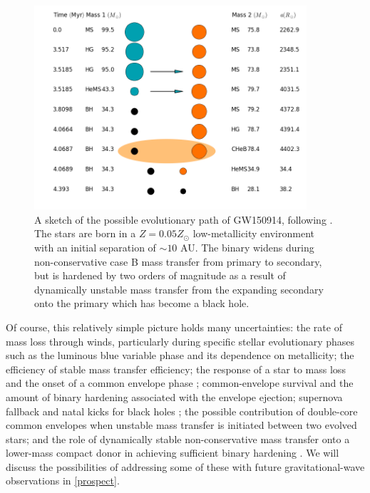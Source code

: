 \documentclass[iop,onecolumn]{revtex4}
\begin{document}
\begin{figure}
	\centering
	\includegraphics[width=0.9\textwidth]{COMPAS.png}
	\caption{\label{fig:COMPAS} A sketch of the possible evolutionary path of GW150914, following \citet{Stevenson:2017}.  The stars are born in a $Z=0.05 Z_\odot$ low-metallicity environment with an initial separation of $\sim 10$ AU.  The binary widens during non-conservative case B mass transfer from primary to secondary, but is hardened by two orders of magnitude as a result of dynamically unstable mass transfer from the expanding secondary onto the primary which has become a black hole.}
\end{figure}

Of course, this relatively simple picture holds many uncertainties: the rate of mass loss through winds, particularly during specific stellar evolutionary phases such as the luminous blue variable phase \citep{Mennekens:2014} and its dependence on metallicity; the efficiency of stable mass transfer efficiency; the response of a star to mass loss and the onset of a common envelope phase \citep{Pavlovskii:2017}; common-envelope survival and the amount of binary hardening associated with the envelope ejection; supernova fallback and natal kicks for black holes \citep[e.g.,][]{Repetto:2012,Mandel:2015kicks}; the possible contribution of double-core common envelopes when unstable mass transfer is initiated between two evolved stars; and the role of dynamically stable non-conservative mass transfer onto a lower-mass compact donor in achieving sufficient binary hardening  \citep{vandenHeuvel:2017,Neijssel:2018}.  We will discuss the possibilities of addressing some of these with future gravitational-wave observations in \autoref{prospect}.
\end{document}
